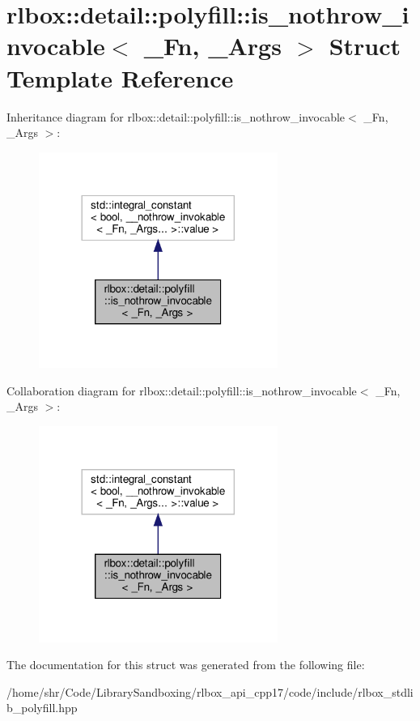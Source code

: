 \hypertarget{structrlbox_1_1detail_1_1polyfill_1_1is__nothrow__invocable}{}\section{rlbox\+:\+:detail\+:\+:polyfill\+:\+:is\+\_\+nothrow\+\_\+invocable$<$ \+\_\+\+Fn, \+\_\+\+Args $>$ Struct Template Reference}
\label{structrlbox_1_1detail_1_1polyfill_1_1is__nothrow__invocable}


Inheritance diagram for rlbox\+:\+:detail\+:\+:polyfill\+:\+:is\+\_\+nothrow\+\_\+invocable$<$ \+\_\+\+Fn, \+\_\+\+Args $>$\+:
\nopagebreak
\begin{figure}[H]
\begin{center}
\leavevmode
\includegraphics[width=221pt]{structrlbox_1_1detail_1_1polyfill_1_1is__nothrow__invocable__inherit__graph}
\end{center}
\end{figure}


Collaboration diagram for rlbox\+:\+:detail\+:\+:polyfill\+:\+:is\+\_\+nothrow\+\_\+invocable$<$ \+\_\+\+Fn, \+\_\+\+Args $>$\+:
\nopagebreak
\begin{figure}[H]
\begin{center}
\leavevmode
\includegraphics[width=221pt]{structrlbox_1_1detail_1_1polyfill_1_1is__nothrow__invocable__coll__graph}
\end{center}
\end{figure}


The documentation for this struct was generated from the following file\+:\begin{DoxyCompactItemize}
\item 
/home/shr/\+Code/\+Library\+Sandboxing/rlbox\+\_\+api\+\_\+cpp17/code/include/rlbox\+\_\+stdlib\+\_\+polyfill.\+hpp\end{DoxyCompactItemize}
